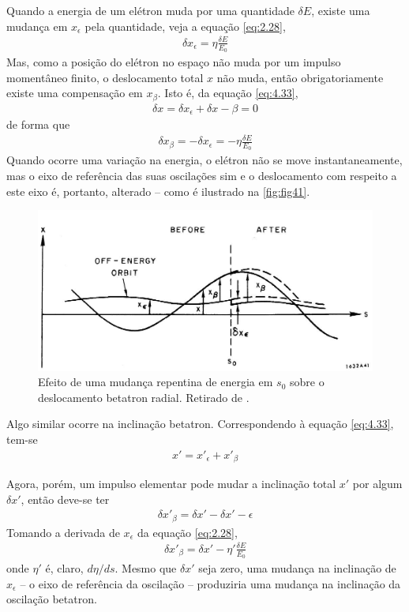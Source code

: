 Quando a energia de um elétron muda por uma quantidade $\delta E$, existe uma mudança em $x_\epsilon$ pela quantidade, veja a equação \eqref{eq:2.28},
\begin{align}
	\delta x_\epsilon = \eta \frac{\delta E}{E_0}
\end{align}
Mas, como a posição do elétron no espaço não muda por um impulso momentâneo finito, o deslocamento total $x$ não muda, então obrigatoriamente existe uma compensação em $x_\beta$. Isto é, da equação \eqref{eq:4.33},
\begin{align*}
	\delta x = \delta x_\epsilon + \delta x-\beta = 0
\end{align*}
de forma que
\begin{align}
	\delta x_\beta = -\delta x_\epsilon = -\eta \frac{\delta E}{E_0}\label{eq:4.35}
\end{align}
Quando ocorre uma variação na energia, o elétron não se move instantaneamente, mas o eixo de referência das suas oscilações sim e o deslocamento com respeito a este eixo é, portanto, alterado --  como é ilustrado na \autoref{fig:fig41}.

\begin{figure}[!htb]
	\centering
	\includegraphics[width=0.9\linewidth]{./Figuras/fig41.jpeg}
	\caption{Efeito de uma mudança repentina de energia em $s_0$ sobre o deslocamento betatron radial. Retirado de \cite{sands1970physics}.}
	\label{fig:fig41}
\end{figure}

Algo similar ocorre na inclinação betatron. Correspondendo à equação \eqref{eq:4.33}, tem-se
\begin{align}
	x' = x'_\epsilon + x'_\beta
\end{align}

Agora, porém, um impulso elementar pode mudar a inclinação total $x'$ por algum $\delta x'$, então deve-se ter
\begin{align}
	\delta x'_\beta = \delta x' - \delta x'-\epsilon
\end{align}
Tomando a derivada de $x_\epsilon$ da equação \eqref{eq:2.28},
\begin{align}
	\delta x'_\beta = \delta x' - \eta' \frac{\delta E}{E_0}\label{eq:4.38}
\end{align}
onde $\eta'$ é, claro, $d\eta/ds$. Mesmo que $\delta x'$ seja zero, uma mudança na inclinação de $x_\epsilon$ -- o eixo de referência da oscilação -- produziria uma mudança na inclinação da oscilação betatron.

